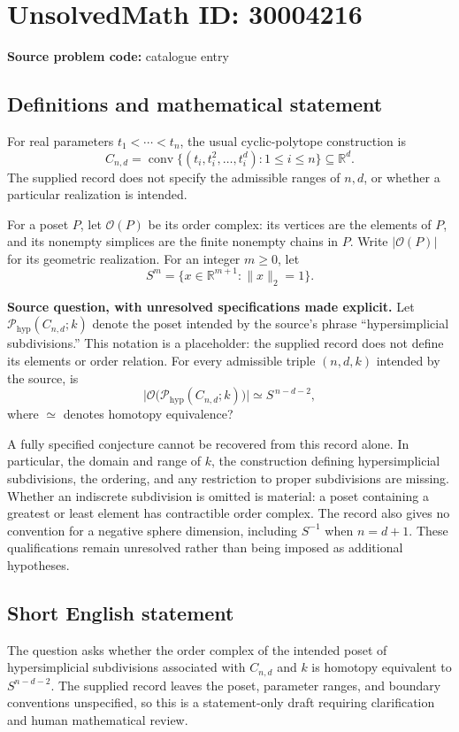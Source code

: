 \documentclass[11pt]{article}
\newcommand{\R}{\mathbb{R}}
\begin{document}
\section*{UnsolvedMath ID: 30004216}
\textbf{Source problem code:} catalogue entry
\subsection{Definitions and mathematical statement}
For real parameters \(t_1<\cdots<t_n\), the usual cyclic-polytope construction is
\[
C_{n,d}=\operatorname{conv}\{(t_i,t_i^2,\ldots,t_i^d):1\le i\le n\}\subseteq\R^d.
\]
The supplied record does not specify the admissible ranges of \(n,d\), or whether a particular realization is intended.

For a poset \(P\), let \(\mathcal O(P)\) be its order complex: its vertices are the elements of \(P\), and its nonempty simplices are the finite nonempty chains in \(P\). Write \(|\mathcal O(P)|\) for its geometric realization. For an integer \(m\ge0\), let
\[
S^m=\{x\in\R^{m+1}:\|x\|_2=1\}.
\]

\textbf{Source question, with unresolved specifications made explicit.} Let \(\mathcal P_{\mathrm{hyp}}(C_{n,d};k)\) denote the poset intended by the source's phrase ``hypersimplicial subdivisions.'' This notation is a placeholder: the supplied record does not define its elements or order relation. For every admissible triple \((n,d,k)\) intended by the source, is
\[
\bigl|\mathcal O\bigl(\mathcal P_{\mathrm{hyp}}(C_{n,d};k)\bigr)\bigr|
\simeq S^{\,n-d-2},
\]
where \(\simeq\) denotes homotopy equivalence?

A fully specified conjecture cannot be recovered from this record alone. In particular, the domain and range of \(k\), the construction defining hypersimplicial subdivisions, the ordering, and any restriction to proper subdivisions are missing. Whether an indiscrete subdivision is omitted is material: a poset containing a greatest or least element has contractible order complex. The record also gives no convention for a negative sphere dimension, including \(S^{-1}\) when \(n=d+1\). These qualifications remain unresolved rather than being imposed as additional hypotheses.
\subsection{Short English statement}
The question asks whether the order complex of the intended poset of hypersimplicial subdivisions associated with \(C_{n,d}\) and \(k\) is homotopy equivalent to \(S^{n-d-2}\). The supplied record leaves the poset, parameter ranges, and boundary conventions unspecified, so this is a statement-only draft requiring clarification and human mathematical review.
\end{document}
